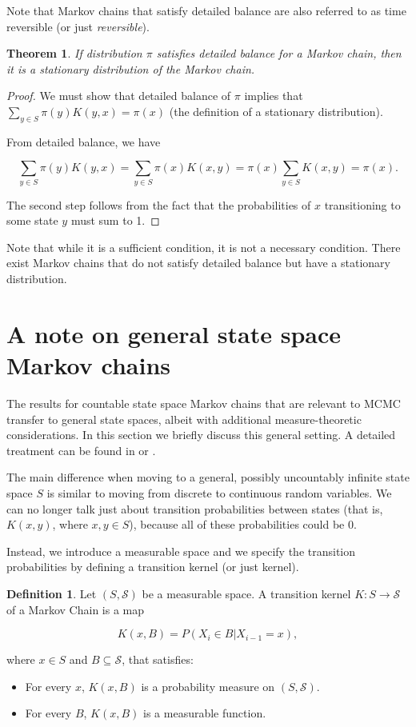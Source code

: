 \documentclass{book}
\theoremstyle{plain}%
\newtheorem{theorem}{Theorem}[section]
\theoremstyle{definition}
\newtheorem{definition}{Definition}[section]
\newlength{\arrow}
\begin{document}
Note that Markov chains that satisfy detailed balance are also referred to as time reversible (or just \textit{reversible}).

\begin{theorem} If distribution $\pi$ satisfies detailed balance for a Markov chain, then it is a stationary distribution of the Markov chain.
\end{theorem}

\begin{proof} We must show that detailed balance of $\pi$ implies that $\sum_{y \in S} \pi(y)K(y,x) = \pi(x)$ (the definition of a stationary distribution).

From detailed balance, we have

$$\sum_{y \in S} \pi(y)K(y,x) = \sum_{y \in S} \pi(x)K(x,y) =  \pi(x) \sum_{y \in S} K(x,y) = \pi(x).$$

The second step follows from the fact that the probabilities of $x$ transitioning to some state $y$ must sum to 1.
\end{proof}

Note that while it is a sufficient condition, it is not a necessary condition. There exist Markov chains that do not satisfy detailed balance but have a stationary distribution.

\section{A note on general state space Markov chains}\label{sec:markov_general}

The results for countable state space Markov chains that are relevant to MCMC transfer to general state spaces, albeit with additional measure-theoretic considerations. In this section we briefly discuss this general setting. A detailed treatment can be found in \cite{Robert2013} or \cite{Meyn2012}.

The main difference when moving to a general, possibly uncountably infinite state space $S$ is similar to moving from discrete to continuous random variables. We can no longer talk just about transition probabilities between states (that is, $K(x,y)$, where $x, y \in S$), because all of these probabilities could be 0.

Instead, we introduce a measurable space and we specify the transition probabilities by defining a transition kernel (or just kernel).

\begin{definition} Let $(S, \mathcal{S})$ be a measurable space. A transition kernel $K: S \rightarrow \mathcal{S}$ of a Markov Chain is a map

$$K(x, B) = P(X_i \in B | X_{i-1} = x),$$

where $x \in S$ and $B \subseteq \mathcal{S}$, that satisfies:

\begin{itemize}
\item For every $x$, $K(x, B)$ is a probability measure on $(S, \mathcal{S})$.
\item For every $B$, $K(x, B)$ is a measurable function.
\end{itemize}
\end{definition}
\end{document}
